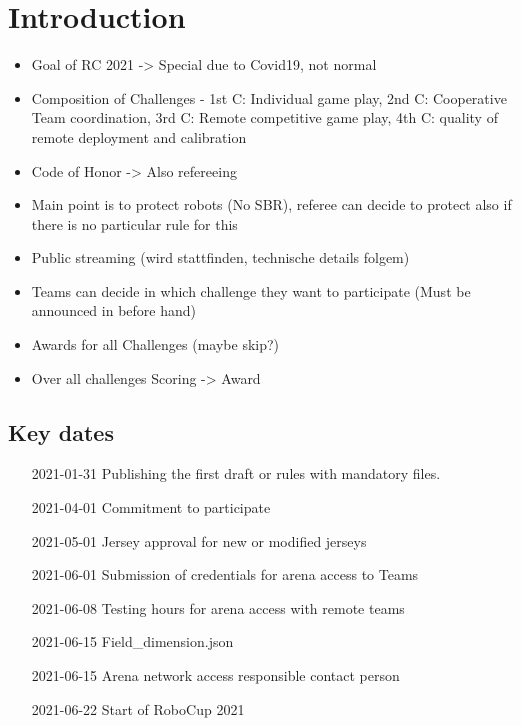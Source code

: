 \section{Introduction}

\begin{itemize}
    \item Goal of RC 2021 -> Special due to Covid19, not normal
    \item Composition of Challenges - 1st C: Individual game play, 2nd C: Cooperative Team coordination, 3rd C: Remote competitive game play, 4th C: quality of remote deployment and calibration 
    \item Code of Honor -> Also refereeing
    \item Main point is to protect robots (No SBR), referee can decide to protect also if there is no particular rule for this
    \item Public streaming (wird stattfinden, technische details folgem)
    \item Teams can decide in which challenge they want to participate (Must be announced in before hand)
    \item Awards for all Challenges (maybe skip?)
    \item Over all challenges Scoring -> Award
\end{itemize}

\subsection{Key dates}

\begin{itemize}
    \item [2021-01-31] Publishing the first draft or rules with mandatory files.
    \item [2021-04-01] Commitment to participate
    \item [2021-05-01] Jersey approval for new or modified jerseys
    \item [2021-06-01] Submission of credentials for arena access to Teams
    \item [2021-06-08] Testing hours for arena access with remote teams
    \item [2021-06-15] Field\_dimension.json
    \item [2021-06-15] Arena network access responsible contact person
    \item [2021-06-22] Start of RoboCup 2021
\end{itemize}
